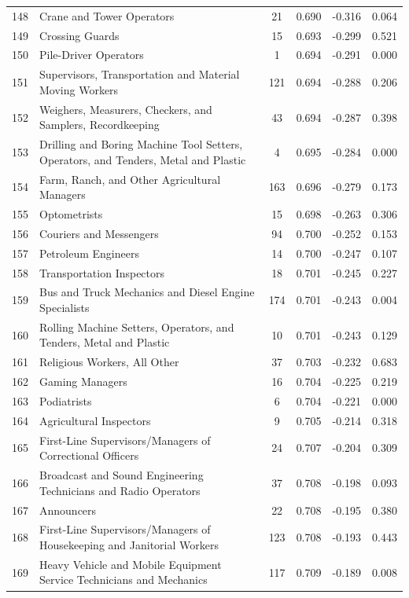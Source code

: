 {\begin{longtable}{llcccc}
 148 & Crane and Tower Operators & 21 & 0.690 & -0.316 & 0.064 \\
 149 & Crossing Guards & 15 & 0.693 & -0.299 & 0.521 \\
 150 & Pile-Driver Operators & 1 & 0.694 & -0.291 & 0.000 \\
 151 & Supervisors, Transportation and Material Moving Workers & 121 & 0.694 & -0.288 & 0.206 \\
 152 & Weighers, Measurers, Checkers, and Samplers, Recordkeeping & 43 & 0.694 & -0.287 & 0.398 \\
 153 & Drilling and Boring Machine Tool Setters, Operators, and Tenders, Metal and Plastic & 4 & 0.695 & -0.284 & 0.000 \\
 154 & Farm, Ranch, and Other Agricultural Managers & 163 & 0.696 & -0.279 & 0.173 \\
 155 & Optometrists & 15 & 0.698 & -0.263 & 0.306 \\
 156 & Couriers and Messengers & 94 & 0.700 & -0.252 & 0.153 \\
 157 & Petroleum Engineers & 14 & 0.700 & -0.247 & 0.107 \\
 158 & Transportation Inspectors & 18 & 0.701 & -0.245 & 0.227 \\
 159 & Bus and Truck Mechanics and Diesel Engine Specialists & 174 & 0.701 & -0.243 & 0.004 \\
 160 & Rolling Machine Setters, Operators, and Tenders, Metal and Plastic & 10 & 0.701 & -0.243 & 0.129 \\
 161 & Religious Workers, All Other & 37 & 0.703 & -0.232 & 0.683 \\
 162 & Gaming Managers & 16 & 0.704 & -0.225 & 0.219 \\
 163 & Podiatrists & 6 & 0.704 & -0.221 & 0.000 \\
 164 & Agricultural Inspectors & 9 & 0.705 & -0.214 & 0.318 \\
 165 & First-Line Supervisors/Managers of Correctional Officers & 24 & 0.707 & -0.204 & 0.309 \\
 166 & Broadcast and Sound Engineering Technicians and Radio Operators & 37 & 0.708 & -0.198 & 0.093 \\
 167 & Announcers & 22 & 0.708 & -0.195 & 0.380 \\
 168 & First-Line Supervisors/Managers of Housekeeping and Janitorial Workers & 123 & 0.708 & -0.193 & 0.443 \\
 169 & Heavy Vehicle and Mobile Equipment Service Technicians and Mechanics & 117 & 0.709 & -0.189 & 0.008 \\

\end{longtable}}
